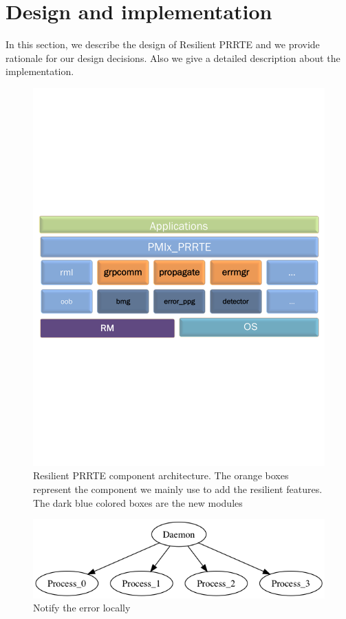 \documentclass[sigconf]{acmart}
\begin{document}
\section{Design and implementation}

In this section, we describe the design of Resilient PRRTE and we provide rationale for our design decisions. Also we give a detailed description about the implementation.

\begin{figure}[h]
  \centering
  \includegraphics[trim=0.2cm 9.0cm 0.2cm 9cm,width=\linewidth]{PMIx_PRRTE.pdf}
  \caption{Resilient PRRTE component architecture. The orange boxes represent the component we mainly use to add the resilient features. The dark blue colored boxes are the new modules}
\end{figure}

\begin{figure}[h]
  \centering
  \includegraphics[width=\linewidth]{test.png}
  \caption{Notify the error locally}
\end{figure}
\end{document}
